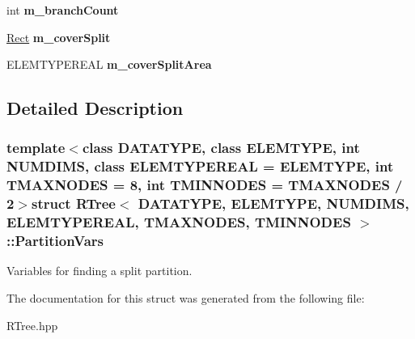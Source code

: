 \begin{DoxyCompactItemize}
\item 
\hypertarget{struct_r_tree_1_1_partition_vars_abaaed8bac2d71bc6debadc5136078a0b}{int {\bfseries m\-\_\-branch\-Count}}\label{struct_r_tree_1_1_partition_vars_abaaed8bac2d71bc6debadc5136078a0b}

\item 
\hypertarget{struct_r_tree_1_1_partition_vars_a61d9eaaae4128365146d923123f4b8d1}{\hyperlink{struct_r_tree_1_1_rect}{\-Rect} {\bfseries m\-\_\-cover\-Split}}\label{struct_r_tree_1_1_partition_vars_a61d9eaaae4128365146d923123f4b8d1}

\item 
\hypertarget{struct_r_tree_1_1_partition_vars_ada65c4c4ae559f43f3b632bda1b7b7f2}{\-E\-L\-E\-M\-T\-Y\-P\-E\-R\-E\-A\-L {\bfseries m\-\_\-cover\-Split\-Area}}\label{struct_r_tree_1_1_partition_vars_ada65c4c4ae559f43f3b632bda1b7b7f2}

\end{DoxyCompactItemize}


\subsection{\-Detailed \-Description}
\subsubsection*{template$<$class \-D\-A\-T\-A\-T\-Y\-P\-E, class \-E\-L\-E\-M\-T\-Y\-P\-E, int \-N\-U\-M\-D\-I\-M\-S, class \-E\-L\-E\-M\-T\-Y\-P\-E\-R\-E\-A\-L = \-E\-L\-E\-M\-T\-Y\-P\-E, int \-T\-M\-A\-X\-N\-O\-D\-E\-S = 8, int \-T\-M\-I\-N\-N\-O\-D\-E\-S = \-T\-M\-A\-X\-N\-O\-D\-E\-S / 2$>$struct R\-Tree$<$ D\-A\-T\-A\-T\-Y\-P\-E, E\-L\-E\-M\-T\-Y\-P\-E, N\-U\-M\-D\-I\-M\-S, E\-L\-E\-M\-T\-Y\-P\-E\-R\-E\-A\-L, T\-M\-A\-X\-N\-O\-D\-E\-S, T\-M\-I\-N\-N\-O\-D\-E\-S $>$\-::\-Partition\-Vars}

\-Variables for finding a split partition. 

\-The documentation for this struct was generated from the following file\-:\begin{DoxyCompactItemize}
\item 
\-R\-Tree.\-hpp\end{DoxyCompactItemize}
